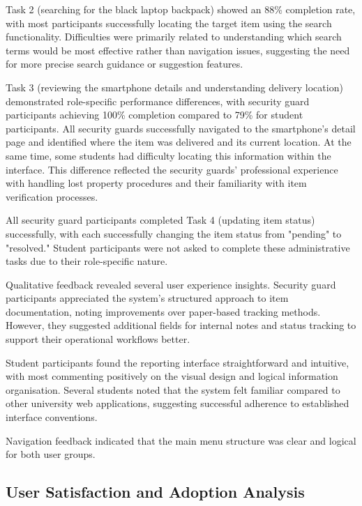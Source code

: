 Task 2 (searching for the black laptop backpack) showed an 88\% completion rate, with most participants successfully locating the target item using the search functionality. Difficulties were primarily related to understanding which search terms would be most effective rather than navigation issues, suggesting the need for more precise search guidance or suggestion features.

Task 3 (reviewing the smartphone details and understanding delivery location) demonstrated role-specific performance differences, with security guard participants achieving 100\% completion compared to 79\% for student participants. All security guards successfully navigated to the smartphone's detail page and identified where the item was delivered and its current location. At the same time, some students had difficulty locating this information within the interface. This difference reflected the security guards' professional experience with handling lost property procedures and their familiarity with item verification processes.

All security guard participants completed Task 4 (updating item status) successfully, with each successfully changing the item status from "pending" to "resolved." Student participants were not asked to complete these administrative tasks due to their role-specific nature.

Qualitative feedback revealed several user experience insights. Security guard participants appreciated the system's structured approach to item documentation, noting improvements over paper-based tracking methods. However, they suggested additional fields for internal notes and status tracking to support their operational workflows better.

Student participants found the reporting interface straightforward and intuitive, with most commenting positively on the visual design and logical information organisation. Several students noted that the system felt familiar compared to other university web applications, suggesting successful adherence to established interface conventions.

Navigation feedback indicated that the main menu structure was clear and logical for both user groups.

\subsection{User Satisfaction and Adoption Analysis} \label{subsection:user_satisfaction}

